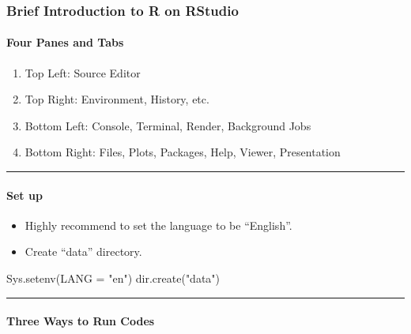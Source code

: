 \documentclass[
]{article}
\newenvironment{Shaded}{\begin{snugshade}}{\end{snugshade}}
\newcommand{\AttributeTok}[1]{\textcolor[rgb]{0.77,0.63,0.00}{#1}}
\newcommand{\FunctionTok}[1]{\textcolor[rgb]{0.00,0.00,0.00}{#1}}
\newcommand{\NormalTok}[1]{#1}
\newcommand{\StringTok}[1]{\textcolor[rgb]{0.31,0.60,0.02}{#1}}
\providecommand{\tightlist}{%
  \setlength{\itemsep}{0pt}\setlength{\parskip}{0pt}}
\begin{document}
\hypertarget{brief-introduction-to-r-on-rstudio}{%
\subsubsection{Brief Introduction to R on
RStudio}\label{brief-introduction-to-r-on-rstudio}}

\hypertarget{four-panes-and-tabs}{%
\paragraph{Four Panes and Tabs}\label{four-panes-and-tabs}}

\begin{enumerate}
\def\labelenumi{\arabic{enumi}.}
\tightlist
\item
  Top Left: Source Editor
\item
  Top Right: Environment, History, etc.
\item
  Bottom Left: Console, Terminal, Render, Background Jobs
\item
  Bottom Right: Files, Plots, Packages, Help, Viewer, Presentation
\end{enumerate}

\begin{center}\rule{0.5\linewidth}{0.5pt}\end{center}

\hypertarget{set-up}{%
\paragraph{Set up}\label{set-up}}

\begin{itemize}
\tightlist
\item
  Highly recommend to set the language to be ``English''.
\item
  Create ``data'' directory.
\end{itemize}

\begin{Shaded}
\begin{Highlighting}[]
\FunctionTok{Sys.setenv}\NormalTok{(}\AttributeTok{LANG =} \StringTok{"en"}\NormalTok{)}
\FunctionTok{dir.create}\NormalTok{(}\StringTok{"data"}\NormalTok{)}
\end{Highlighting}
\end{Shaded}

\begin{center}\rule{0.5\linewidth}{0.5pt}\end{center}

\hypertarget{three-ways-to-run-codes}{%
\paragraph{Three Ways to Run Codes}\label{three-ways-to-run-codes}}
\end{document}
